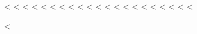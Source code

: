<%
<%
<%
<%
<%
<%
<%
<%
<%
<%
<%
<%
<%
<%
<%
<%
<%
<%
\fi
<%
<%
<%

\renewcommand{\lstlistlistingname}{Verzeichnis der Listings}

\usepackage{chngcntr}
<%

\lstloadlanguages{%
}
